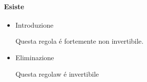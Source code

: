 \documentclass{article}
\begin{document}
\paragraph{Esiste}
\begin{itemize}
    \item Introduzione \begin{mathpar}
    \end{mathpar}
    Questa regola é fortemente non invertibile.
    \item Eliminazione \begin{mathpar}
    \end{mathpar}
    Questa regolaw é invertibile
\end{itemize}
\end{document}
